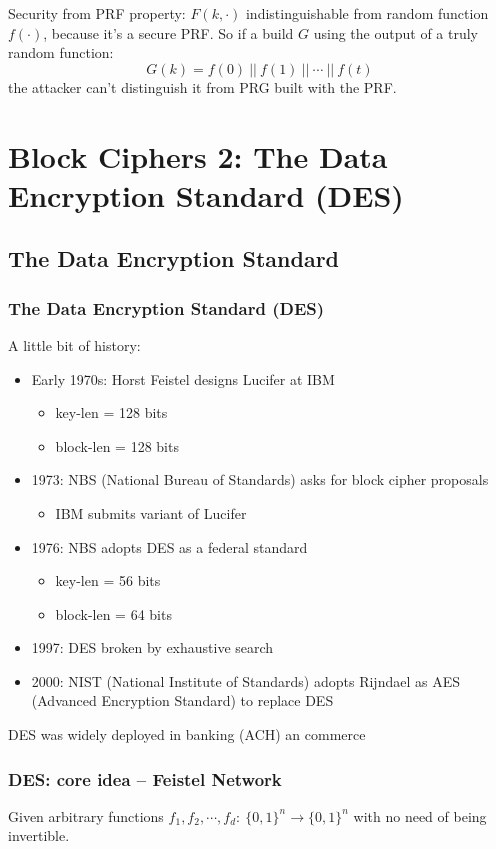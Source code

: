 \documentclass[12pt]{book}
\begin{document}
Security from PRF property: $F(k,\cdot)$ indistinguishable from random function $f(\cdot)$, because it's a secure PRF. So if a build $G$ using the output of a truly random function: $$G(k)=f(0)\ ||\ f(1)\ ||\ \cdots\ ||\ f(t)$$the attacker can't distinguish it from PRG built with the PRF.

\newpage
\section{Block Ciphers 2: The Data Encryption Standard (DES)}
\subsection{The Data Encryption Standard}
\subsubsection{The Data Encryption Standard (DES)}
A little bit of history:
\begin{itemize}
	\item Early 1970s: Horst Feistel designs Lucifer at IBM
	\begin{itemize}
		\item key-len = 128 bits
		\item block-len = 128 bits
	\end{itemize}
	\item 1973: NBS (National Bureau of Standards) asks for block cipher proposals
	\begin{itemize}
		\item IBM submits variant of Lucifer
	\end{itemize}
	\item 1976: NBS adopts DES as a federal standard
	\begin{itemize}
		\item key-len = 56 bits
		\item block-len = 64 bits
	\end{itemize}
	\item 1997: DES broken by exhaustive search
	\item 2000: NIST (National Institute of Standards) adopts Rijndael as AES (Advanced Encryption Standard) to replace DES
\end{itemize}

DES was widely deployed in banking (ACH) an commerce

\subsubsection{DES: core idea -- Feistel Network}
Given arbitrary functions $f_{1},f_{2},\cdots,f_{d}:\ \{0,1\}^{n}\rightarrow\{0,1\}^{n}$ with no need of being invertible.
\end{document}
